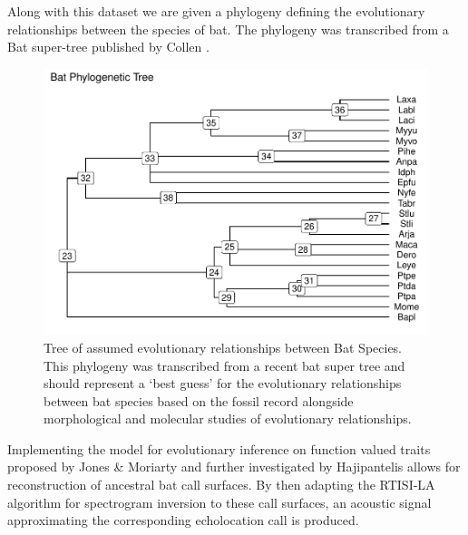 \documentclass[]{article}
\begin{document}
Along with this dataset we are given a phylogeny defining the evolutionary relationships between the species of bat. The phylogeny was transcribed from a Bat super-tree published by Collen \cite{collen2012evolution}.

\begin{figure}[htbp]
\centering
\includegraphics{for_mark_files/figure-latex/phylogeny figure-1.pdf}
\caption{Tree of assumed evolutionary relationships between Bat Species. This phylogeny was transcribed from a recent bat super tree and should represent a `best guess' for the evolutionary relationships between bat species based on the fossil record alongside morphological and molecular studies of evolutionary relationships.}
\label{fig:phylo}
\end{figure}

Implementing the model for evolutionary inference on function valued traits proposed by Jones \& Moriarty \cite{jones2013evolutionary} and further investigated by Hajipantelis \cite{hadjipantelis2013function} allows for reconstruction of ancestral bat call surfaces. By then adapting the RTISI-LA algorithm for spectrogram inversion \cite{zhu2007real} to these call surfaces, an acoustic signal approximating the corresponding echolocation call is produced.
\end{document}
